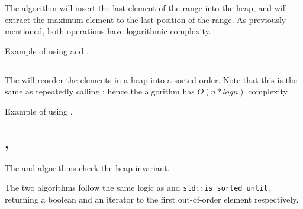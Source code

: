 The  algorithm will insert the last element of the range into the heap, and  will extract the maximum element to the last position of the range. As previously mentioned, both operations have logarithmic complexity.

\begin{box-note}
\footnotesize Example of using  and .
\tcblower
{}
\end{box-note}

\subsection{\texorpdfstring{}{\texttt{std::sort\_heap}}}

The  will reorder the elements in a heap into a sorted order. Note that this is the same as repeatedly calling ; hence the algorithm has $O(n*logn)$ complexity.


\begin{box-note}
\footnotesize Example of using .
\tcblower
{}
\end{box-note}

\subsection{\texorpdfstring{, }{\texttt{std::is\_heap}, \texttt{std::is\_heap\_until}}}

The  and  algorithms check the heap invariant.



The two algorithms follow the same logic as  and \texttt{std::is\-\_sorted\-\_until}, returning a boolean and an iterator to the first out-of-order element respectively.

